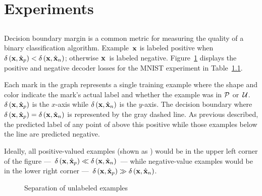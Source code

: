 \section{Experiments}

\subsection{}

Decision boundary margin is a common metric for measuring the quality of a binary classification algorithm. Example~$\mathbf{x}$ is labeled positive when ${\delta\left(\mathbf{x}, \hat{\mathbf{x}}_{p}\right)<\delta\left(\mathbf{x}, \hat{\mathbf{x}}_{n}\right)}$; otherwise $\mathbf{x}$~is labeled negative. Figure~\ref{fig:Experiments:UnlabelPlot} displays the positive and negative decoder losses for the MNIST experiment in Table~\ref{}.

Each mark in the graph represents a single training example where the shape and color indicate the mark's actual label and whether the example was in $\mathcal{P}$ or~$\mathcal{U}$. $\delta\left(\mathbf{x}, \hat{\mathbf{x}}_{p}\right)$ is the $x$-axis while $\delta\left(\mathbf{x}, \hat{\mathbf{x}}_{n}\right)$ is the $y$-axis. The decision boundary where ${\delta\left(\mathbf{x}, \hat{\mathbf{x}}_{p}\right)=\delta\left(\mathbf{x}, \hat{\mathbf{x}}_{n}\right)}$ is represented by the gray dashed line.  As previous described, the predicted label of any point of above this positive while those examples below the line are predicted negative.

Ideally, all positive-valued examples (shown as ) would be in the upper left corner of the figure ---~${\delta\left(\mathbf{x}, \hat{\mathbf{x}}_{p}\right)\ll\delta\left(\mathbf{x}, \hat{\mathbf{x}}_{n}\right)}$~--- while negative-value examples would be in the lower right corner ---~${\delta\left(\mathbf{x}, \hat{\mathbf{x}}_{p}\right)\gg\delta\left(\mathbf{x}, \hat{\mathbf{x}}_{n}\right)}$.

\begin{figure}[h]
  \centering
  
  \caption{Separation of unlabeled examples}\label{fig:Experiments:UnlabelPlot}
\end{figure}

